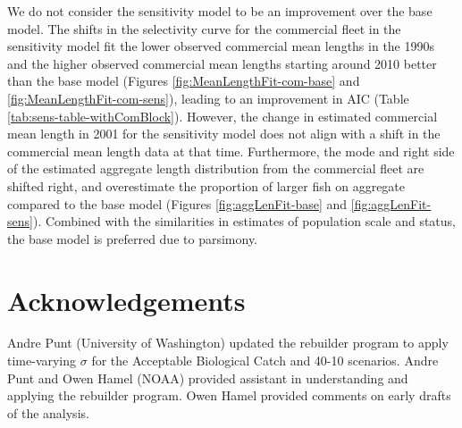 \documentclass[11pt,
  english,
  a4paper,
]{article}
\begin{document}
\leavevmode\tagmcend\tagstructend\par


We do not consider the sensitivity model to be an improvement over the base model. The shifts in the selectivity curve for the commercial fleet in the sensitivity model fit the lower observed commercial mean lengths in the 1990s and the higher observed commercial mean lengths starting around 2010 better than the base model (Figures \ref{fig:MeanLengthFit-com-base} and \ref{fig:MeanLengthFit-com-sens}), leading to an improvement in AIC (Table \ref{tab:sens-table-withComBlock}). However, the change in estimated commercial mean length in 2001 for the sensitivity model does not align with a shift in the commercial mean length data at that time. Furthermore, the mode and right side of the estimated aggregate length distribution from the commercial fleet are shifted right, and overestimate the proportion of larger fish on aggregate compared to the base model (Figures \ref{fig:aggLenFit-base} and \ref{fig:aggLenFit-sens}). Combined with the similarities in estimates of population scale and status, the base model is preferred due to parsimony.

\leavevmode\tagmcend\tagstructend\par


\hypertarget{acknowledgements}{%
\section{Acknowledgements}\label{acknowledgements}}

\leavevmode\tagmcend\tagstructend


Andre Punt (University of Washington) updated the rebuilder program to apply time-varying {\(\sigma\)\leavevmode\tagmcend\tagstructend} for the Acceptable Biological Catch and 40-10 scenarios. Andre Punt and Owen Hamel (NOAA) provided assistant in understanding and applying the rebuilder program. Owen Hamel provided comments on early drafts of the analysis.

\leavevmode\tagmcend\tagstructend\par

\clearpage

\end{document}
